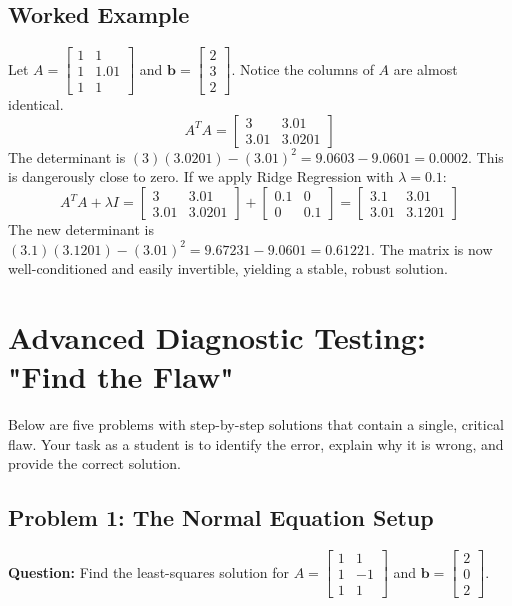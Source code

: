 \documentclass[11pt, letterpaper]{article}
\theoremstyle{definition}
\theoremstyle{remark}
\begin{document}
\subsection{Worked Example}
Let $A = \begin{bmatrix} 1 & 1 \\ 1 & 1.01 \\ 1 & 1 \end{bmatrix}$ and $\mathbf{b} = \begin{bmatrix} 2 \\ 3 \\ 2 \end{bmatrix}$. Notice the columns of $A$ are almost identical.
\[ A^T A = \begin{bmatrix} 3 & 3.01 \\ 3.01 & 3.0201 \end{bmatrix} \]
The determinant is $(3)(3.0201) - (3.01)^2 = 9.0603 - 9.0601 = 0.0002$. This is dangerously close to zero.
If we apply Ridge Regression with $\lambda = 0.1$:
\[ A^T A + \lambda I = \begin{bmatrix} 3 & 3.01 \\ 3.01 & 3.0201 \end{bmatrix} + \begin{bmatrix} 0.1 & 0 \\ 0 & 0.1 \end{bmatrix} = \begin{bmatrix} 3.1 & 3.01 \\ 3.01 & 3.1201 \end{bmatrix} \]
The new determinant is $(3.1)(3.1201) - (3.01)^2 = 9.67231 - 9.0601 = 0.61221$. The matrix is now well-conditioned and easily invertible, yielding a stable, robust solution.

\newpage
\section{Advanced Diagnostic Testing: "Find the Flaw"}

Below are five problems with step-by-step solutions that contain a single, critical flaw. Your task as a student is to identify the error, explain why it is wrong, and provide the correct solution.

\subsection{Problem 1: The Normal Equation Setup}
\textbf{Question:} Find the least-squares solution for $A = \begin{bmatrix} 1 & 1 \\ 1 & -1 \\ 1 & 1 \end{bmatrix}$ and $\mathbf{b} = \begin{bmatrix} 2 \\ 0 \\ 2 \end{bmatrix}$.
\end{document}
